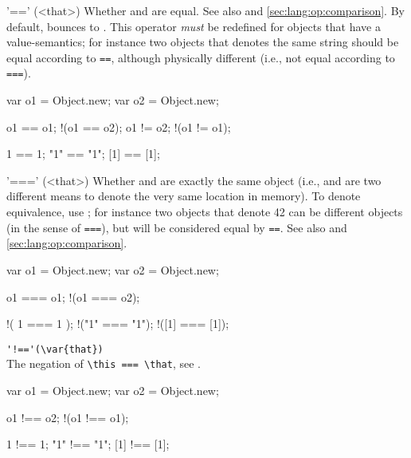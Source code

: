 \begin{urbiscriptapi}

\item['=='](<that>)%
  Whether \this and \that are equal.  See also  and
  \autoref{sec:lang:op:comparison}.  By default, bounces to
  .  This operator \emph{must} be redefined for objects that
  have a value-semantics; for instance two  objects that
  denotes the same string should be equal according to \lstinline|==|,
  although physically different (i.e., not equal according to
  \lstinline|===|).
\begin{urbiassert}
var o1 = Object.new;
var o2 = Object.new;

      o1 == o1;
    !(o1 == o2);
      o1 != o2;
    !(o1 != o1);

      1  ==  1;
     "1" == "1";
     [1] == [1];
\end{urbiassert}

\item['==='](<that>)%
  Whether \this and \that are exactly the same object (i.e., \this and \that
  are two different means to denote the very same location in memory).  To
  denote equivalence, use ; for instance two 
  objects that denote 42 can be different objects (in the sense of
  \lstinline|===|), but will be considered equal by \lstinline|==|.  See
  also  and \autoref{sec:lang:op:comparison}.
\begin{urbiassert}
var o1 = Object.new;
var o2 = Object.new;

      o1 === o1;
    !(o1 === o2);

    !( 1  ===  1 );
    !("1" === "1");
    !([1] === [1]);
\end{urbiassert}

\item \lstinline|'!=='(\var{that})|\\%
  The negation of \lstinline|\this === \that|, see .
\begin{urbiassert}
var o1 = Object.new;
var o2 = Object.new;

      o1 !== o2;
    !(o1 !== o1);

      1  !==  1;
     "1" !== "1";
     [1] !== [1];
\end{urbiassert}

\end{urbiscriptapi}

